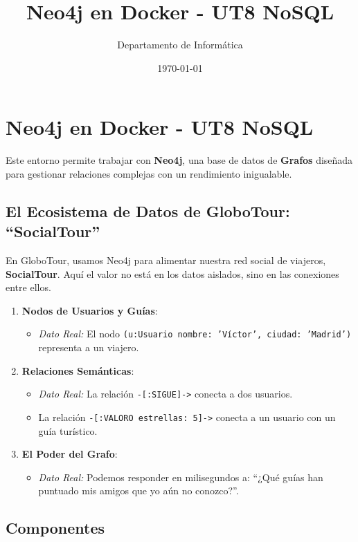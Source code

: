 \documentclass[12pt,a4paper]{article}
\title{\textbf{Neo4j en Docker - UT8 NoSQL}}
\author{Departamento de Informática}
\date{\today}
\begin{document}
\maketitle

\section{Neo4j en Docker - UT8 NoSQL}\label{neo4j-en-docker---ut8-nosql}

Este entorno permite trabajar con \textbf{Neo4j}, una base de datos de \textbf{Grafos} diseñada para gestionar relaciones complejas con un rendimiento inigualable.

\subsection{El Ecosistema de Datos de GloboTour: \enquote{SocialTour}}\label{ecosistema}
En GloboTour, usamos Neo4j para alimentar nuestra red social de viajeros, \textbf{SocialTour}. Aquí el valor no está en los datos aislados, sino en las conexiones entre ellos.

\begin{enumerate}
    \item \textbf{Nodos de Usuarios y Guías}: 
    \begin{itemize}
        \item \textit{Dato Real:} El nodo \texttt{(u:Usuario {nombre: 'Víctor', ciudad: 'Madrid'})} representa a un viajero.
    \end{itemize}
    \item \textbf{Relaciones Semánticas}: 
    \begin{itemize}
        \item \textit{Dato Real:} La relación \texttt{-[:SIGUE]->} conecta a dos usuarios.
        \item La relación \texttt{-[:VALORO {estrellas: 5}]->} conecta a un usuario con un guía turístico.
    \end{itemize}
    \item \textbf{El Poder del Grafo}:
    \begin{itemize}
        \item \textit{Dato Real:} Podemos responder en milisegundos a: \enquote{¿Qué guías han puntuado mis amigos que yo aún no conozco?}.
    \end{itemize}
\end{enumerate}

\subsection{Componentes}\label{componentes}
\end{document}
